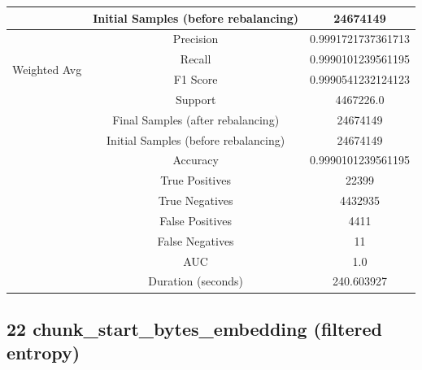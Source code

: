\begin{longtable}{|c|c|c|}
 & Initial Samples (before rebalancing) & 24674149 \\
\hline
\multirow{4}{*}{Weighted Avg} & Precision & 0.9991721737361713 \\
 & Recall & 0.9990101239561195 \\
 & F1 Score & 0.9990541232124123 \\
 & Support & 4467226.0 \\
 & Final Samples (after rebalancing) & 24674149 \\
 & Initial Samples (before rebalancing) & 24674149 \\
\hline
& Accuracy & 0.9990101239561195 \\ \hline
& True Positives & 22399 \\ \hline
& True Negatives & 4432935 \\ \hline
& False Positives & 4411 \\ \hline
& False Negatives & 11 \\ \hline
& AUC & 1.0 \\ \hline
& Duration (seconds) & 240.603927 \\ \hline
\end{longtable}


\subsection{22 chunk\_start\_bytes\_embedding (filtered entropy)}


